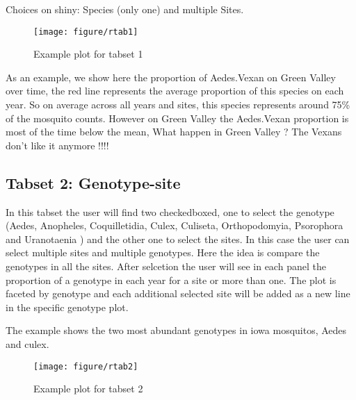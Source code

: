 \documentclass{article}\usepackage[]{graphicx}\usepackage[]{color}
\makeatletter
\def\maxwidth{ %
  \ifdim\Gin@nat@width>\linewidth
    \linewidth
  \else
    \Gin@nat@width
  \fi
}
\newenvironment{knitrout}{}{} %
\makeatother
\begin{document}

Choices on shiny: Species (only one) and multiple Sites. 
\begin{figure}[hbpt]
\begin{knitrout}
\color{fgcolor}
\texttt{[image: figure/rtab1]} 

\end{knitrout}

\caption{Example plot for tabset 1 \label{tab1}}
\end{figure}
As an example, we show here the proportion of Aedes.Vexan on Green Valley over time, the red line represents the average proportion of this species on each year. So on average across all years and sites, this species represents around 75\% of the mosquito counts. However on Green Valley the Aedes.Vexan proportion is most of the time below the mean, What happen in Green Valley ? The Vexans don't like it anymore !!!! 

\subsection{Tabset 2: Genotype-site}

In this tabset the user will find two checkedboxed, one to select the genotype (Aedes, Anopheles, Coquilletidia, Culex, Culiseta, Orthopodomyia, Psorophora and Uranotaenia ) and the other one to select the sites. In this case the user can select multiple sites and multiple genotypes. Here the idea is compare the genotypes in all the sites. After selcetion the user will see in each panel the proportion of a genotype in each year for a site or more than one.  The plot is faceted by genotype and each additional selected site will be added as a new line in the specific genotype plot.

The example shows the two most abundant genotypes in iowa mosquitos, Aedes and culex. 
\begin{figure}
\begin{knitrout}
\color{fgcolor}
\texttt{[image: figure/rtab2]} 

\end{knitrout}

\caption{Example plot for tabset 2 \label{tab2}}
\end{figure}
\end{document}
